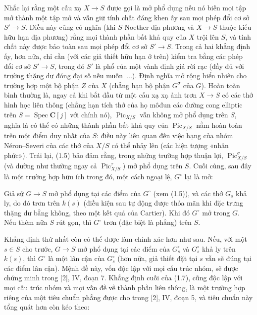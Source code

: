  Nhắc lại rằng một cấu xạ $X\longrightarrow S$ được gọi
là mở phổ dụng nếu nó biến mọi tập mở thành một tập mở và vẫn giữ tính chất
đáng khen ấy sau mọi phép đổi cơ sở $S'\longrightarrow S$. Điều này cũng có
nghĩa (khi $S$ Noether địa phương và $X\longrightarrow S$ thuộc kiểu hữu hạn
địa phương) rằng mọi thành phần bất khả quy của $X$ trội lên $S$, và tính chất
này được bảo toàn sau mọi phép đổi cơ sở $S'\longrightarrow S$. Trong cả hai
khẳng định ấy, hơn nữa, chỉ cần (với các giả thiết hữu hạn ở trên) kiểm tra
bằng các phép đổi cơ sở $S'\longrightarrow S$, trong đó $S'$ là phổ của một
vành định giá rời rạc (đầy đủ với trường thặng dư đóng đại số nếu muốn~...).
Định nghĩa mở rộng hiển nhiên cho trường hợp một bộ phận $Z$ của $X$ (chẳng
hạn bộ phận $G^\sigma$ của $G$). Hoàn toàn bình thường là, ngay cả khi bắt đầu
từ một cấu xạ xạ ảnh trơn $X\longrightarrow S$ có các thớ hình học liên thông
(chẳng hạn tích thớ của họ môđun các đường cong elliptic trên
$S=\operatorname{Spec}\mathbf C[j]$ với chính nó),
$\operatorname{Pic}_{X/S}$ vẫn không mở phổ dụng trên $S$, nghĩa là có thể có
những thành phần bất khả quy của $\operatorname{Pic}_{X/S}$ nằm hoàn toàn
trên một điểm duy nhất của $S$: điều này liên quan đến việc hạng của nhóm
Néron--Severi của các thớ của $X/S$ có thể nhảy lên (các hiện tượng «nhân
phức»). Trái lại, (1.5) bảo đảm rằng, trong những trường hợp thuận lợi,
$\operatorname{Pic}_{X/S}^\sigma$ (và dường như thường ngay cả
$\operatorname{Pic}_{X/S}^\tau$) mở phổ dụng trên $S$.
Cuối cùng, sau đây là một trường hợp hữu ích trong đó, một cách ngoại lệ,
$G^\circ$ lại là mở:

 Giả sử $G\longrightarrow S$ mở phổ dụng tại các điểm của
$G^\circ$ (xem (1.5)), và các thớ $G_s$ khả ly, do đó trơn trên $k(s)$ (điều
kiện sau tự động được thỏa mãn khi đặc trưng thặng dư bằng không, theo một kết
quả của Cartier). Khi đó $G^\circ$ mở trong $G$. Nếu thêm nữa $S$ rút gọn, thì
$G^\circ$ trơn (đặc biệt là phẳng) trên $S$.

Khẳng định thứ nhất còn có thể được làm chính xác hơn như sau. Nếu, với một
$s\in S$ cho trước, $G\longrightarrow S$ mở phổ dụng tại các điểm của
$G_s^\circ$ và $G_s^\circ$ khả ly trên $k(s)$, thì $G^\circ$ là một lân cận
của $G_s^\circ$ (hơn nữa, giả thiết đặt tại $s$ vẫn sẽ đúng tại các điểm lân
cận). Mệnh đề này, vốn độc lập với mọi cấu trúc nhóm, sẽ được chứng minh trong
[2], IV, đoạn 7. Khẳng định cuối của (1.7), cũng độc lập với mọi cấu trúc nhóm
và mọi vấn đề về thành phần liên thông, là một trường hợp riêng của một tiêu
chuẩn phẳng được cho trong [2], IV, đoạn 5, và tiêu chuẩn này tổng quát hơn còn
kéo theo:

